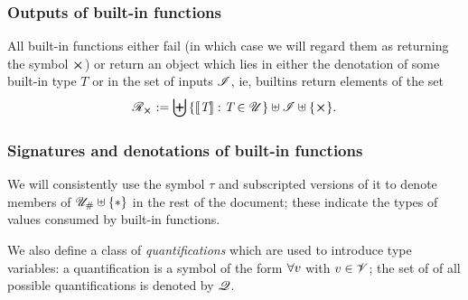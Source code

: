 \subsubsection{Outputs of built-in functions}
\label{sec:builtin-outputs}
All built-in functions either fail (in which case we will regard them as
returning the symbol $\errorX$) or return an object which lies in either the
denotation of some built-in type $T$ or in the set of inputs $\mathscr{I}$, ie,
builtins return elements of the set
$$
\R_{\errorX} := \bigdisj\left\{\denote{\tn}: \tn \in \Uni \right\} \disj \Inputs \disj \{\errorX\}.
$$%

\subsubsection{Signatures and denotations of built-in functions}
\label{sec:signatures}
We will consistently use the symbol $\tau$ and subscripted versions of it to
denote members of $\UnihashStar$ in the rest of the document; these indicate the
types of values consumed by built-in functions.%

\medskip
\noindent We also define a class of \textit{quantifications} which are used to
introduce type variables: a quantification is a symbol of the form
$\mathbf{\forall}v$ with $v \in \mathscr{V}$; the set of of all possible quantifications is
denoted by $\mathscr{Q}$.%
%

\medskip
